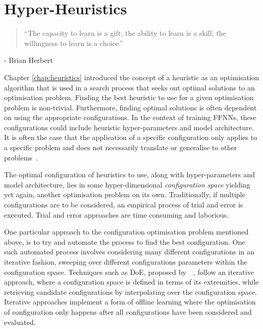 \chapter{Hyper-Heuristics}\label{chap:hhs}

\begin{quotation}
      ``The capacity to learn is a gift; the ability to learn is a skill; the willingness to learn is a choice.''
\end{quotation}
\begin{flushright}
      - Brian Herbert
\end{flushright}

Chapter \ref{chap:heuristics} introduced the concept of a heuristic as an optimisation algorithm that is used in a search process that seeks out optimal solutions to an optimisation problem. Finding the best heuristic to use for a given optimisation problem is non-trivial. Furthermore, finding optimal solutions is often dependent on using the appropriate configurations. In the context of training \acp{FFNN}, these configurations could include heuristic hyper-parameters and model architecture. It is often the case that the application of a specific configuration only applies to a specific problem and does not necessarily translate or generalise to other problems~\cite{ref:kheiri:2017}.

The optimal configuration of heuristics to use, along with hyper-parameters and model architecture, lies in some hyper-dimensional \textit{configuration space} yielding yet again, another optimisation problem on its own. Traditionally, if multiple configurations are to be considered, an empirical process of trial and error is executed. Trial and error approaches are time consuming and laborious.

One particular approach to the configuration optimisation problem mentioned above, is to try and automate the process to find the best configuration. One such automated process involves considering many different configurations in an iterative fashion, sweeping over different configurations parameters within the configuration space. Techniques such as \acf{DoE}, proposed by~\citeauthor{ref:fisher:1937}~\cite{ref:fisher:1937}, follow an iterative approach, where a configuration space is defined in terms of its extremities, while retrieving candidate configurations by interpolating over the configuration space. Iterative approaches implement a form of offline learning where the optimisation of configuration only happens after all configurations have been considered and evaluated.

